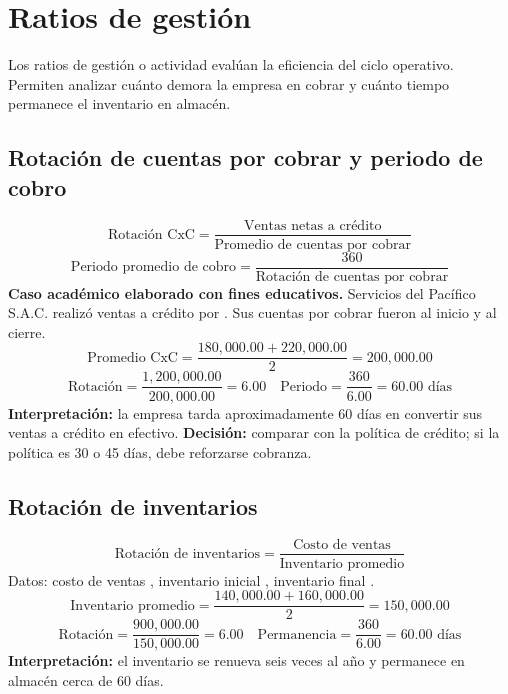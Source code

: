 \section{Ratios de gestión}
Los ratios de gestión o actividad evalúan la eficiencia del ciclo operativo. Permiten analizar cuánto demora la empresa en cobrar y cuánto tiempo permanece el inventario en almacén.

\subsection{Rotación de cuentas por cobrar y periodo de cobro}
\[
\text{Rotación CxC}=\frac{\text{Ventas netas a crédito}}{\text{Promedio de cuentas por cobrar}}
\]
\[
\text{Periodo promedio de cobro}=\frac{360}{\text{Rotación de cuentas por cobrar}}
\]
\textbf{Caso académico elaborado con fines educativos.} Servicios del Pacífico S.A.C. realizó ventas a crédito por . Sus cuentas por cobrar fueron  al inicio y  al cierre.
\[
\text{Promedio CxC}=\frac{180,000.00+220,000.00}{2}=200,000.00
\]
\[
\text{Rotación}=\frac{1,200,000.00}{200,000.00}=6.00
\quad
\text{Periodo}=\frac{360}{6.00}=60.00\text{ días}
\]
\textbf{Interpretación:} la empresa tarda aproximadamente 60 días en convertir sus ventas a crédito en efectivo.
\textbf{Decisión:} comparar con la política de crédito; si la política es 30 o 45 días, debe reforzarse cobranza.

\newpage
\subsection{Rotación de inventarios}
\[
\text{Rotación de inventarios}=\frac{\text{Costo de ventas}}{\text{Inventario promedio}}
\]
Datos: costo de ventas , inventario inicial , inventario final .
\[
\text{Inventario promedio}=\frac{140,000.00+160,000.00}{2}=150,000.00
\]
\[
\text{Rotación}=\frac{900,000.00}{150,000.00}=6.00
\quad
\text{Permanencia}=\frac{360}{6.00}=60.00\text{ días}
\]
\textbf{Interpretación:} el inventario se renueva seis veces al año y permanece en almacén cerca de 60 días.
